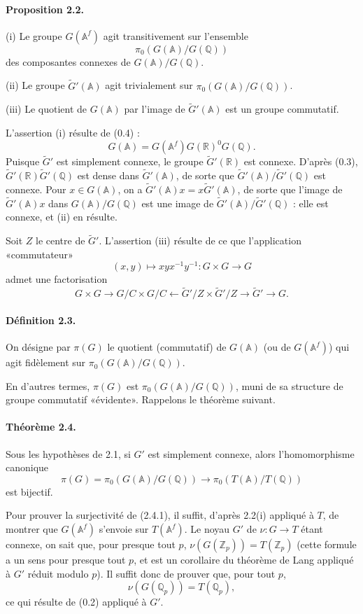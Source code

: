 \documentclass[10pt]{article}
\newcommand{\A}{\mathbb A}
\newcommand{\Af}{\mathbb A^f}
\newcommand{\Q}{\mathbb Q}
\newcommand{\R}{\mathbb R}
\newcommand{\Z}{\mathbb Z}
\begin{document}
\paragraph{Proposition 2.2.} (i) Le groupe $G(\Af)$ agit transitivement sur l'ensemble
\[
\pi_0(G(\A)/G(\Q))
\]
des composantes connexes de $G(\A)/G(\Q)$.

(ii) Le groupe $\widetilde G'(\A)$ agit trivialement sur $\pi_0(G(\A)/G(\Q))$.

(iii) Le quotient de $G(\A)$ par l'image de $\widetilde G'(\A)$ est un groupe commutatif.

L'assertion (i) résulte de (0.4) :
\[
G(\A)=G(\Af)G(\R)^0G(\Q).
\]
Puisque $\widetilde G'$ est simplement connexe, le groupe $\widetilde G'(\R)$ est connexe. D'après (0.3), $\widetilde G'(\R)\widetilde G'(\Q)$ est dense dans $\widetilde G'(\A)$, de sorte que $\widetilde G'(\A)/\widetilde G'(\Q)$ est connexe. Pour $x\in G(\A)$, on a $\widetilde G'(\A)x=x\widetilde G'(\A)$, de sorte que l'image de $\widetilde G'(\A)x$ dans $G(\A)/G(\Q)$ est une image de $\widetilde G'(\A)/\widetilde G'(\Q)$ : elle est connexe, et (ii) en résulte.

Soit $Z$ le centre de $\widetilde G'$. L'assertion (iii) résulte de ce que l'application «commutateur»
\[
(x,y)\longmapsto xyx^{-1}y^{-1}:G\times G\longrightarrow G
\]
admet une factorisation
\[
G\times G\longrightarrow G/C\times G/C\longleftarrow \widetilde G'/Z\times \widetilde G'/Z\longrightarrow \widetilde G'\longrightarrow G.
\]

\paragraph{Définition 2.3.} On désigne par $\pi(G)$ le quotient (commutatif) de $G(\A)$ (ou de $G(\Af)$) qui agit fidèlement sur $\pi_0(G(\A)/G(\Q))$.

En d'autres termes, $\pi(G)$ est $\pi_0(G(\A)/G(\Q))$, muni de sa structure de groupe commutatif «évidente». Rappelons le théorème suivant.

\paragraph{Théorème 2.4.} Sous les hypothèses de 2.1, si $G'$ est simplement connexe, alors l'homomorphisme canonique
\[
\pi(G)=\pi_0(G(\A)/G(\Q))\longrightarrow \pi_0(T(\A)/T(\Q)) \tag{2.4.1}
\]
est bijectif.

Pour prouver la surjectivité de (2.4.1), il suffit, d'après 2.2(i) appliqué à $T$, de montrer que $G(\Af)$ s'envoie sur $T(\Af)$. Le noyau $G'$ de $\nu:G\to T$ étant connexe, on sait que, pour presque tout $p$, $\nu(G(\Z_p))=T(\Z_p)$ (cette formule a un sens pour presque tout $p$, et est un corollaire du théorème de Lang appliqué à $G'$ réduit modulo $p$). Il suffit donc de prouver que, pour tout $p$,
\[
\nu(G(\Q_p))=T(\Q_p),
\]
ce qui résulte de (0.2) appliqué à $G'$.
\end{document}

